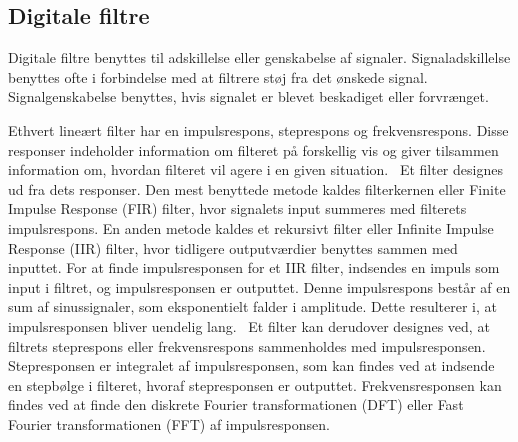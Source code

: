 \subsection{Digitale filtre}
Digitale filtre benyttes til adskillelse eller genskabelse af signaler. Signaladskillelse benyttes ofte i forbindelse med at filtrere støj fra det ønskede signal. Signalgenskabelse benyttes, hvis signalet er blevet beskadiget eller forvrænget.~\citep{Smith1997}

Ethvert lineært filter har en impulsrespons, steprespons og frekvensrespons. Disse responser indeholder information om filteret på forskellig vis og giver tilsammen information om, hvordan filteret vil agere i en given situation.~\citep{Smith1997} Et filter designes ud fra dets responser. Den mest benyttede metode kaldes filterkernen eller Finite Impulse Response (FIR) filter, hvor signalets input summeres med filterets impulsrespons. En anden metode kaldes et rekursivt filter eller Infinite Impulse Response (IIR) filter, hvor tidligere outputværdier benyttes sammen med inputtet. For at finde impulsresponsen for et IIR filter, indsendes en impuls som input i filtret, og impulsresponsen er outputtet. Denne impulsrespons består af en sum af sinussignaler, som eksponentielt falder i amplitude. Dette resulterer i, at impulsresponsen bliver uendelig lang.~\citep{Smith1997,Blandford2013} \newline
Et filter kan derudover designes ved, at filtrets steprespons eller frekvensrespons sammenholdes med impulsresponsen. Stepresponsen er integralet af impulsresponsen, som kan findes ved at indsende en stepbølge i filteret, hvoraf stepresponsen er outputtet. Frekvensresponsen kan findes ved at finde den diskrete Fourier transformationen (DFT) eller Fast Fourier transformationen (FFT) af impulsresponsen.~\citep{Smith1997} 

